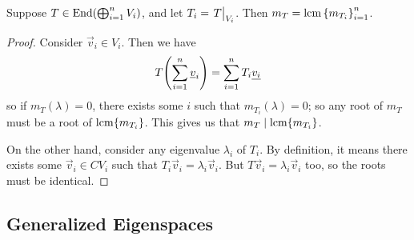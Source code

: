 \begin{proposition}\label{prop:min-poly-direct-sum}
    Suppose \(T \in \operatorname{End}(\bigoplus_{i=1}^n V_i)\),
    and let \(T_i = \eval{T}_{V_i}\).
    Then \(m_T = \operatorname{lcm}{\{m_{T_i}\}}_{i=1}^n\).
\end{proposition}
\begin{proof}
    Consider \(\vec{v}_i \in V_i\).
    Then we have
    \begin{equation*}
        T\pqty{\sum_{i=1}^n \vec{v}_i} = \sum_{i=1}^n T_i\vec{v_i}
    \end{equation*}
    so if \(m_T(\lambda) = 0\), there exists some \(i\) such that \(m_{T_i}(\lambda) = 0\);
    so any root of \(m_T\) must be a root of \(\operatorname{lcm}\{m_{T_i}\}\).
    This gives us that \(m_T \mid \operatorname{lcm}\{m_{T_i}\}\).

    On the other hand, consider any eigenvalue \(\lambda_i\) of \(T_i\).
    By definition, it means there exists some \(\vec{v}_i \in CV_i\)
    such that \(T_i\vec{v}_i = \lambda_i\vec{v}_i\).
    But \(T\vec{v}_i = \lambda_i\vec{v}_i\) too,
    so the roots must be identical.
\end{proof}

\subsection*{Generalized Eigenspaces}

